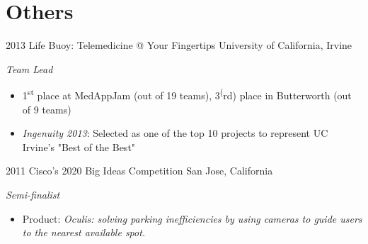 \documentclass[]{friggeri-cv} %
\begin{document}

\pagebreak
\section{Others}

\begin{entrylist}
\entry
{2013}
{Life Buoy: Telemedicine @ Your Fingertips}
{University of California, Irvine}
{\emph{Team Lead} 
\begin{itemize}
\item 1\textsuperscript{st}  place at MedAppJam (out of 19 teams), 3\textsuperscript(rd) place in Butterworth (out of 9 teams)
\item \emph{Ingenuity 2013}: Selected as one of the top 10 projects to represent UC Irvine's "Best of the Best"
\end{itemize}}
\entry
{2011}
{Cisco's 2020 Big Ideas Competition}
{San Jose, California}
{\emph{Semi-finalist} 
\begin{itemize}
\item Product: \emph{Oculis: solving parking inefficiencies by using cameras to guide users to the nearest available spot.}\end{itemize}}
\end{entrylist}

%
%
\end{document}
